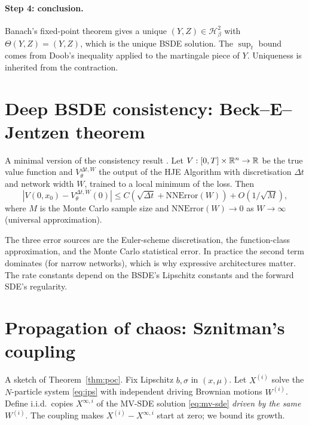 \paragraph{Step 4: conclusion.}  Banach's fixed-point theorem gives a unique $(Y, Z) \in \mathcal{H}^2_\beta$ with $\Theta(Y, Z) = (Y, Z)$, which is the unique BSDE solution. The $\sup_t$ bound comes from Doob's inequality applied to the martingale piece of $Y$. Uniqueness is inherited from the contraction.

\section{Deep BSDE consistency: Beck--E--Jentzen theorem}
\label{app:beck-jentzen}

A minimal version of the consistency result \cite{beck2019}. Let $V : [0, T] \times \mathbb{R}^n \to \mathbb{R}$ be the true value function and $V^{\Delta t, W}_\theta$ the output of the HJE Algorithm with discretisation $\Delta t$ and network width $W$, trained to a local minimum of the loss. Then
\begin{equation}
  |V(0, x_0) - V^{\Delta t, W}_\theta(0)| \leq C\left(\sqrt{\Delta t} + \text{NNError}(W)\right) + O(1/\sqrt{M}),
\end{equation}
where $M$ is the Monte Carlo sample size and $\text{NNError}(W) \to 0$ as $W \to \infty$ (universal approximation).

The three error sources are the Euler-scheme discretisation, the function-class approximation, and the Monte Carlo statistical error. In practice the second term dominates (for narrow networks), which is why expressive architectures matter. The rate constants depend on the BSDE's Lipschitz constants and the forward SDE's regularity.

\section{Propagation of chaos: Sznitman's coupling}
\label{app:sznitman}

A sketch of Theorem~\ref{thm:poc}. Fix Lipschitz $b, \sigma$ in $(x, \mu)$. Let $X^{(i)}$ solve the $N$-particle system \eqref{eq:ips} with independent driving Brownian motions $W^{(i)}$. Define i.i.d.\ copies $X^{\infty, i}$ of the MV-SDE solution \eqref{eq:mv-sde} \emph{driven by the same $W^{(i)}$}. The coupling makes $X^{(i)} - X^{\infty, i}$ start at zero; we bound its growth.

